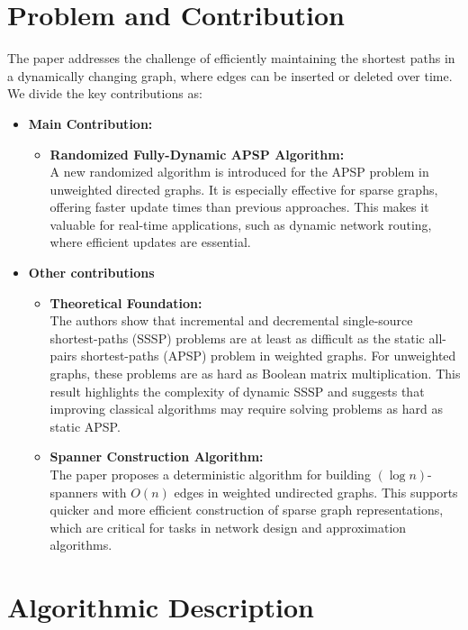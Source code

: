\documentclass{report}
\begin{document}
\section*{Problem and Contribution}
The paper addresses the challenge of efficiently maintaining the shortest paths in a dynamically changing graph, where edges can be inserted or deleted over time. We divide the key contributions as:\\ 

\begin{itemize}
    \item \textbf{Main Contribution:}
    \begin{itemize}
        \item \textbf{Randomized Fully-Dynamic APSP Algorithm:} \\ A new randomized algorithm is introduced for the APSP problem in unweighted directed graphs. It is especially effective for sparse graphs, offering faster update times than previous approaches. This makes it valuable for real-time applications, such as dynamic network routing, where efficient updates are essential.
    \end{itemize}
    \item \textbf{Other contributions}
    \begin{itemize}
        \item \textbf{Theoretical Foundation:} \\ The authors show that incremental and decremental single-source shortest-paths (SSSP) problems are at least as difficult as the static all-pairs shortest-paths (APSP) problem in weighted graphs. For unweighted graphs, these problems are as hard as Boolean matrix multiplication. This result highlights the complexity of dynamic SSSP and suggests that improving classical algorithms may require solving problems as hard as static APSP.
        \item \textbf{Spanner Construction Algorithm:} \\ The paper proposes a deterministic algorithm for building $(\log n)$-spanners with $O(n)$ edges in weighted undirected graphs. This supports quicker and more efficient construction of sparse graph representations, which are critical for tasks in network design and approximation algorithms.
    \end{itemize}
\end{itemize}
    
\section*{Algorithmic Description}
\end{document}
